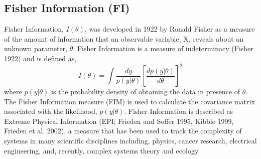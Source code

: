 \documentclass[12pt,twoside,openany]{reedthesis}
\begin{document}
\subsection{Fisher Information (FI)}\label{fisher-information-fi}

Fisher Information, \(I(\theta)\), was developed in 1922 by Ronald
Fisher as a measure of the amount of information that an observable
variable, X, reveals about an unknown parameter, \(\theta\). Fisher
Information is a measure of indeterminacy (Fisher 1922) and is defined
as,
\begin{equation} 
  I(\theta) = \int \frac{dy}{p(y|\theta)}\left[\frac{dp(y|\theta)}{d\theta}\right]^2
  \label{eq:fiGeneral1922}
\end{equation}
where \(p(y|\theta)\) is the probability density of obtaining the data
in presence of \(\theta\). The Fisher Information measure (FIM) is used
to calculate the covariance matrix associated with the likelihood,
\(p(y|\theta)\). Fisher Information is described as Extreme Physical
Information (EPI; Frieden and Soffer 1995, Kibble 1999, Frieden et al.
2002), a measure that has been used to track the complexity of systems
in many scientific disciplines including, physics, cancer research,
electrical engineering, and, recently, complex systems theory and
ecology
\end{document}
